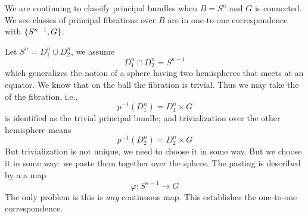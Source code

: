 We are continuing to classify principal bundles when $B=S^{n}$
and $G$ is connected. We see classes of principal fibrations over
$B$ are in one-to-one correspondence with $\homotopyClass(S^{n-1},G)$.

Let $S^{n}=D^{n}_{1}\cup D^{n}_{2}$, we assume
\begin{equation}
D^{n}_{1}\cap D^{n}_{2}=S^{n-1}
\end{equation}
which generalizes the notion of a sphere having two hemispheres
that meets at an equator. We know that on the ball the fibration
is trivial. Thus we may take
the 
of the fibration, i.e.,
\begin{equation}
p^{-1}(D^{n}_{1})=D^{n}_{1}\times G
\end{equation}
is identified as the trivial principal bundle; and trivialization
over the other hemisphere means
\begin{equation}
p^{-1}(D^{n}_{2})=D^{n}_{2}\times G
\end{equation}
But trivialization is not unique, we need to choose it in some
way. But we choose it in some way: we paste them together over
the sphere. The pasting is described by a 
a map
\begin{equation}
\varphi\colon S^{n-1}\to G
\end{equation}
The only problem is this is \emph{any} continuous map. This
establishes the one-to-one correspondence.

